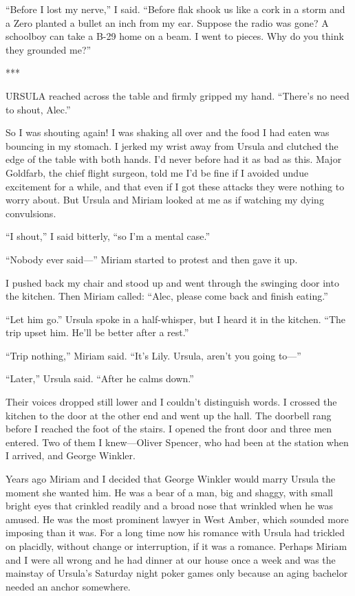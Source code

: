 {“Before I lost my nerve,” I said. “Before flak shook us like a cork in a storm and a Zero planted a bullet an inch from my ear. Suppose the radio was gone? A schoolboy can take a B-29 home on a beam. I went to pieces. Why do you think they grounded me?”

***

URSULA reached across the table and firmly gripped my hand. “There’s no need to shout, Alec.”

So I was shouting again! I was shaking all over and the food I had eaten was bouncing in my stomach. I jerked my wrist away from Ursula and clutched the edge of the table with both hands. I’d never before had it as bad as this. Major Goldfarb, the chief flight surgeon, told me I’d be fine if I avoided undue excitement for a while, and that even if I got these attacks they were nothing to worry about. But Ursula and Miriam looked at me as if watching my dying convulsions.

“I shout,” I said bitterly, “so I’m a mental case.”

“Nobody ever said—” Miriam started to protest and then gave it up.

I pushed back my chair and stood up and went through the swinging door into the kitchen. Then Miriam called: “Alec, please come back and finish eating.”

“Let him go.” Ursula spoke in a half-whisper, but I heard it in the kitchen. “The trip upset him. He’ll be better after a rest.”

“Trip nothing,” Miriam said. “It’s Lily. Ursula, aren’t you going to—”

“Later,” Ursula said. “After he calms down.”

Their voices dropped still lower and I couldn’t distinguish words. I crossed the kitchen to the door at the other end and went up the hall. The doorbell rang before I reached the foot of the stairs. I opened the front door and three men entered. Two of them I knew—Oliver Spencer, who had been at the station when I arrived, and George Winkler.

Years ago Miriam and I decided that George Winkler would marry Ursula the moment she wanted him. He was a bear of a man, big and shaggy, with small bright eyes that crinkled readily and a broad nose that wrinkled when he was amused. He was the most prominent lawyer in West Amber, which sounded more imposing than it was. For a long time now his romance with Ursula had trickled on placidly, without change or interruption, if it was a romance. Perhaps Miriam and I were all wrong and he had dinner at our house once a week and was the mainstay of Ursula’s Saturday night poker games only because an aging bachelor needed an anchor somewhere.

}
